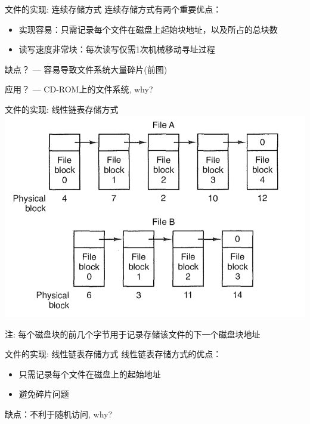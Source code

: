 \documentclass[xcolor=svgnames]{beamer}
\begin{document}
\begin{CJK*}{UTF8}{gbsn}
\begin{frame}{文件的实现: 连续存储方式}
连续存储方式有两个重要优点：
\begin{itemize}
\item 实现容易：只需记录每个文件在磁盘上起始块地址，以及所占的总块数
\item 读写速度非常块：每次读写仅需1次机械移动寻址过程
\end{itemize}

\alert{缺点？} --- 容易导致文件系统大量碎片(前图)

\alert{应用？} --- CD-ROM上的文件系统, why?
\end{frame}

\begin{frame}{文件的实现: 线性链表存储方式}
\includegraphics[width=1.0\textwidth]{linked.png}

\alert{注}: 每个磁盘块的前几个字节用于记录存储该文件的下一个磁盘块地址
\end{frame}

\begin{frame}{文件的实现: 线性链表存储方式}
线性链表存储方式的优点：
\begin{itemize}
\item 只需记录每个文件在磁盘上的起始地址
\item 避免碎片问题
\end{itemize}

缺点：不利于随机访问, why?
\end{frame}


\end{CJK*}
\end{document}
